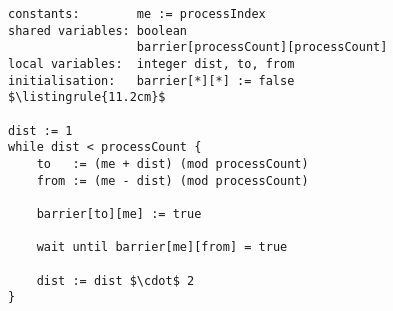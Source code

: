 \begin{center}
\begin{minipage}{\textwidth}
\begin{lstlisting}[mathescape, linewidth=11.2cm]
constants:        me := processIndex
shared variables: boolean
                  barrier[processCount][processCount]
local variables:  integer dist, to, from
initialisation:   barrier[*][*] := false
$\listingrule{11.2cm}$

dist := 1
while dist < processCount {
	to   := (me + dist) (mod processCount)
	from := (me - dist) (mod processCount)
	
	barrier[to][me] := true
	
	wait until barrier[me][from] = true

	dist := dist $\cdot$ 2
}
\end{lstlisting}
\end{minipage}
\end{center}

